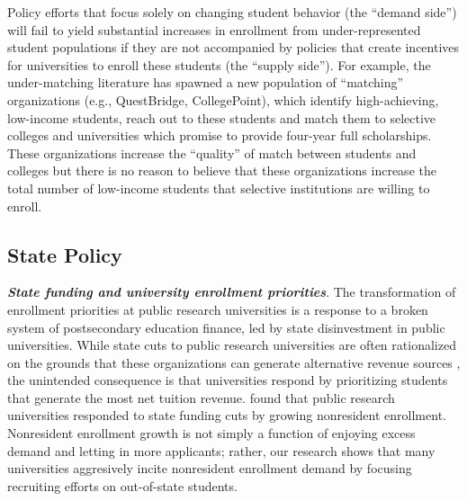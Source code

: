 \documentclass[twoside]{article}
\begin{document}
Policy efforts that focus solely on changing student behavior (the ``demand side'') will fail to yield substantial increases in enrollment from under-represented student populations if they are not accompanied by policies that create incentives for universities to enroll these students (the ``supply side'').  For example, the under-matching literature has spawned a new population of ``matching'' organizations (e.g., QuestBridge, CollegePoint), which identify high-achieving, low-income students, reach out to these students and match them to selective colleges and universities which promise to provide four-year full scholarships.  These organizations increase the ``quality'' of match between students and colleges but there is no reason to believe that these organizations increase the total number of low-income students that selective institutions are willing to enroll.

\subsection*{State Policy}

\textbf{\textit{State funding and university enrollment priorities}}. The transformation of enrollment priorities at public research universities is a response to a broken system of postsecondary education finance, led by state disinvestment in public universities.  While state cuts to public research universities are often rationalized on the grounds that these organizations can generate alternative revenue sources \citep{RN2271}, the unintended consequence is that universities respond by prioritizing students that generate the most net tuition revenue.  \cite{RN3753} found that public research universities responded to state funding cuts by growing nonresident enrollment. Nonresident enrollment growth is not simply a function of enjoying excess demand and letting in more applicants; rather, our research shows that many universities aggresively incite nonresident enrollment demand by focusing recruiting efforts on out-of-state students.
\end{document}
